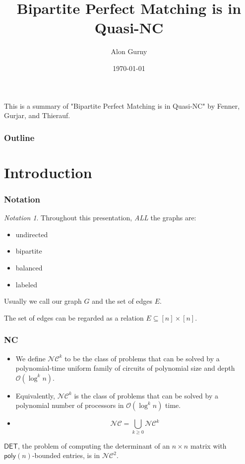 \documentclass{beamer}
\title{Bipartite Perfect Matching is in Quasi-NC}
\author{Alon Gurny}
\date{\today}
\theoremstyle{remark}
\newtheorem{notation}{Notation}
\newcommand{\nc}{{\mathcal{NC}}}
\newcommand{\OO}{\mathcal{O}}
\begin{document}
\frame{\titlepage}

\begin{frame}
  \begin{block}[Abstract]
    This is a summary of "Bipartite Perfect Matching is in Quasi-NC" by Fenner, Gurjar, and Thierauf.
  \end{block}
  \frametitle{Outline}
  \tableofcontents
\end{frame}

\section{Introduction}

% 

\begin{frame}
  \frametitle{Notation}

  \begin{notation}

    Throughout this presentation, \emph{ALL} the graphs are:
    \begin{itemize}
      \item undirected
      \item bipartite
      \item balanced
      \item labeled
    \end{itemize}

    Usually we call our graph $G$ and the set of edges $E$.

    The set of edges can be regarded as a relation $E \subseteq [n] \times [n]$.
  \end{notation}
\end{frame}

\begin{frame}
  \frametitle{NC}

  \begin{definition}
    \begin{itemize}
      \item We define $\nc^k$ to be the class of problems that can be solved
            by a polynomial-time uniform family of circuits of polynomial
            size and depth $\OO(\log^k n)$.
      \item Equivalently, $\nc^k$ is the class of problems that can be solved
            by a polynomial number of processors in $\OO(\log^k n)$ time.
      \item \[
              \nc = \bigcup_{k \ge 0} \nc^k
            \]
    \end{itemize}
  \end{definition}

  \begin{fact}
    $\mathsf{DET}$,
    the problem of computing the determinant of an $n \times n$ matrix
    with $\mathsf{poly}(n)$-bounded entries,
    is in $\nc^2$.
  \end{fact}
\end{frame}
\end{document}
